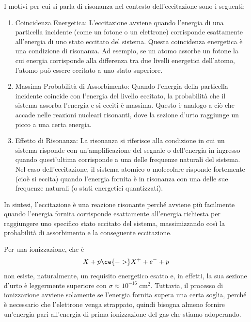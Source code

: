 \begin{approfondimento}
   I motivi per cui si parla di risonanza nel contesto dell'eccitazione sono i seguenti:
   \begin{enumerate}[leftmargin=0.5cm]
      \item Coincidenza Energetica: L'eccitazione avviene quando l'energia di una particella incidente (come un fotone o un elettrone) corrisponde esattamente all'energia di uno stato eccitato del sistema. Questa coincidenza energetica è una condizione di risonanza. Ad esempio, se un atomo assorbe un fotone la cui energia corrisponde alla differenza tra due livelli energetici dell'atomo, l'atomo può essere eccitato a uno stato superiore.
      \item Massima Probabilità di Assorbimento: Quando l'energia della particella incidente coincide con l'energia del livello eccitato, la probabilità che il sistema assorba l'energia e si ecciti è massima. Questo è analogo a ciò che accade nelle reazioni nucleari risonanti, dove la sezione d'urto raggiunge un picco a una certa energia.
      \item Effetto di Risonanza: La risonanza si riferisce alla condizione in cui un sistema risponde con un'amplificazione del segnale o dell'energia in ingresso quando quest'ultima corrisponde a una delle frequenze naturali del sistema. Nel caso dell'eccitazione, il sistema atomico o molecolare risponde fortemente (cioè si eccita) quando l'energia fornita è in risonanza con una delle sue frequenze naturali (o stati energetici quantizzati).
   \end{enumerate}
   In sintesi, l'eccitazione è una reazione risonante perché avviene più facilmente quando l'energia fornita corrisponde esattamente all'energia richiesta per raggiungere uno specifico stato eccitato del sistema, massimizzando così la probabilità di assorbimento e la conseguente eccitazione.
\end{approfondimento}

Per una ionizzazione, che è
\begin{equation*}
   X + p \ce{->} X^+ + e^- + p
\end{equation*}
non esiste, naturalmente, un requisito energetico esatto e, in effetti, la sua sezione d'urto è leggermente superiore con $\sigma \approx 10^{-16} \; \text{cm}^2$. Tuttavia, il processo di ionizzazione avviene solamente se l'energia fornita supera una certa soglia, perché è necessario che l'elettrone venga strappato, quindi bisogna almeno fornire un'energia pari all'energia di prima ionizzazione del gas che stiamo adoperando.

